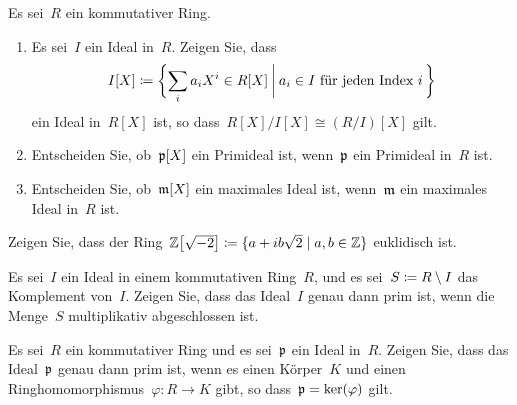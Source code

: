 \documentclass{scrartcl}
\begin{document}
\begin{exercise}
  Es sei~$R$ ein kommutativer Ring.
  \begin{enumerate}
    \item
      Es sei~$I$ ein Ideal in~$R$.
      Zeigen Sie, dass
      \[
        I[X]
        \defined
        \biggl\{
          \sum_i a_i X^i \in R[X]
        \suchthat[\bigg]
          \text{$a_i \in I$ für jeden Index~$i$}
          \spacing
        \biggr\}
      \]
      ein Ideal in~$R[X]$ ist, so dass~$R[X] / I[X] \cong (R/I)[X]$ gilt.
    \item
      Entscheiden Sie, ob~$\mathfrak{p}[X]$ ein Primideal ist, wenn~$\mathfrak{p}$ ein Primideal in~$R$ ist.
    \item
      Entscheiden Sie, ob~$\mathfrak{m}[X]$ ein maximales Ideal ist, wenn~$\mathfrak{m}$ ein maximales Ideal in~$R$ ist.
  \end{enumerate}
\end{exercise}


\begin{exercise}
  Zeigen Sie, dass der Ring~$\Integer\bigl[ \sqrt{-2} \bigr] \defined \{ a + i b \sqrt{2} \suchthat a, b \in \Integer \}$ euklidisch ist.
\end{exercise}

\begin{exercise}
  Es sei~$I$ ein Ideal in einem kommutativen Ring~$R$, und es sei~$S \coloneqq R \setminus I$ das Komplement von~$I$.
  Zeigen Sie, dass das Ideal~$I$ genau dann prim ist, wenn die Menge~$S$ multiplikativ abgeschlossen ist.
\end{exercise}

\begin{exercise}
  Es sei~$R$ ein kommutativer Ring und es sei~$\mathfrak{p}$ ein Ideal in~$R$.
  Zeigen Sie, dass das Ideal~$\mathfrak{p}$ genau dann prim ist, wenn es einen Körper~$K$ und einen Ringhomomorphismus~$\varphi \colon R \to K$ gibt, so dass~$\mathfrak{p} = \ker(\varphi)$ gilt.
\end{exercise}
\end{document}
